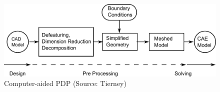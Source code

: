 

	\bigskip
	
	\begin{figure} [!h]
		\centering
		\includegraphics[width=0.9\linewidth]{..//Common/images/CADCAEGeneralProcess.pdf}
		\caption{Computer-aided PDP (Source: Tierney\cite{Tierney2013})}
		\label{fig:introduction:cadcaeworkflow}
	\end{figure}


	\bigskip
	

